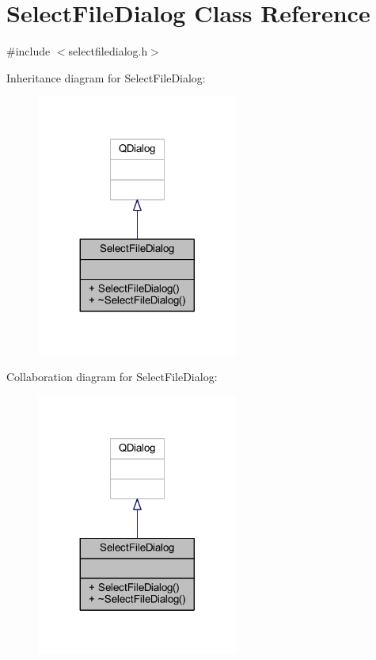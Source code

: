 \hypertarget{class_select_file_dialog}{\section{Select\-File\-Dialog Class Reference}
\label{class_select_file_dialog}
}


{\ttfamily \#include $<$selectfiledialog.\-h$>$}



Inheritance diagram for Select\-File\-Dialog\-:
\nopagebreak
\begin{figure}[H]
\begin{center}
\leavevmode
\includegraphics[width=188pt]{class_select_file_dialog__inherit__graph}
\end{center}
\end{figure}


Collaboration diagram for Select\-File\-Dialog\-:
\nopagebreak
\begin{figure}[H]
\begin{center}
\leavevmode
\includegraphics[width=188pt]{class_select_file_dialog__coll__graph}
\end{center}
\end{figure}
